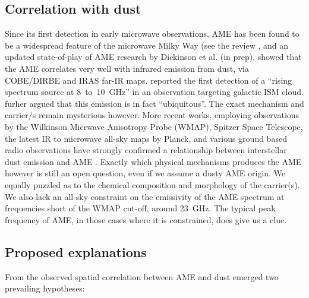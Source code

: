     \subsection{Correlation with dust}
         Since its first detection in early microwave observations, AME has been found to be a widespread feature of the microwave Milky Way (see the review \cite{dickinson13r}, and an updated state-of-play of AME research by Dickinson et al. (in prep). \cite{kogut96,deoliveiracosta97} showed that the AME correlates very well with infrared emission from dust, via COBE/DIRBE and IRAS far-IR maps.  \cite{finkbeiner02} reported the first detection of a ``rising spectrum source at 8~to~10~GHz'' in an observation targeting galactic ISM cloud. \cite{deoliveiracosta02} furher argued that this emission is in fact ``ubiquitous''. The exact mechanism and carrier/s remain mysterious however.
        More recent works, employing observations by the Wilkinson Micrwave Anisotropy Probe (WMAP), Spitzer Space Telescope, the latest IR to microwave all-sky maps by Planck, and various ground based radio observations have strongly confirmed a relationship between interstellar dust emission and AME \citep{ysard10a,tibbs11,hensley16}. Exactly which physical mechanisms produces the AME however is still an open question, even if we assume a dusty AME origin. We equally puzzled as to the chemical composition and morphology of the carrier(s). We also lack an all-sky constraint on the emissivity of the AME spectrum at frequencies short of the WMAP cut-off, around 23~GHz. The typical peak frequency of AME, in those cases where it is constrained, does give us a clue.

  \subsection{Proposed explanations}
     From the observed spatial correlation between AME and dust emerged two prevailing hypotheses:

